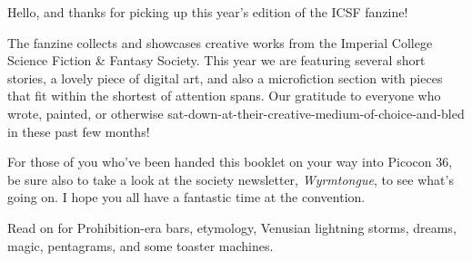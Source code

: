 \noindent
Hello, and thanks for picking up this year's edition of the ICSF
fanzine!

The fanzine collects and showcases creative works from the Imperial
College Science Fiction \& Fantasy Society. This year we are
featuring several short stories, a lovely piece of digital art, and
also a microfiction section with pieces that fit within the shortest
of attention spans. Our gratitude to everyone who wrote, painted, or
otherwise sat-down-at-their-creative-medium-of-choice-and-bled in
these past few months!

For those of you who've been handed this booklet on your way into
Picocon 36, be sure also to take a look at the society
newsletter, \textit{Wyrmtongue}, to see what's going on. I hope you
all have a fantastic time at the convention.

 Read on for Prohibition-era bars, etymology, Venusian lightning
storms, dreams, magic, pentagrams, and some toaster machines.
